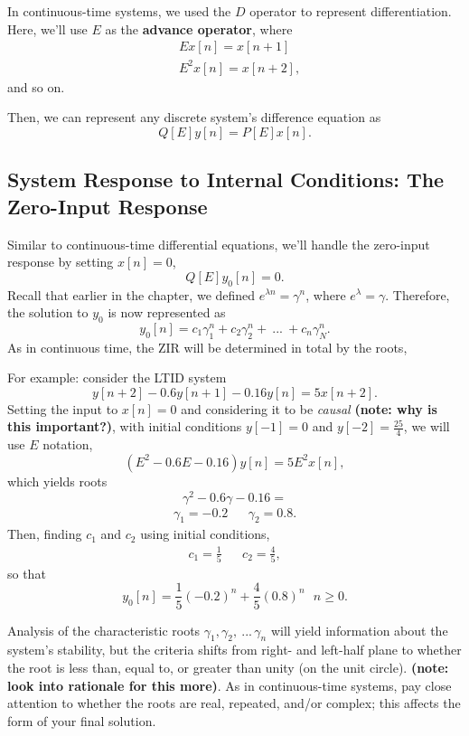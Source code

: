 \documentclass{article}
\begin{document}
In continuous-time systems, we used the \(D\) operator to represent differentiation. Here, we'll use \(E\) as the \textbf{advance operator}, where
\begin{align*}
	&Ex[n] = x[n+1] \\
	&E^2x[n] = x[n+2],
\end{align*}
and so on.

Then, we can represent any discrete system's difference equation as
\[
	Q[E]y[n] = P[E]x[n].
\]

\subsection{System Response to Internal Conditions: The Zero-Input Response}

Similar to continuous-time differential equations, we'll handle the zero-input response by setting \(x[n] = 0\),
\[
	Q[E]y_0[n] = 0.
\]
Recall that earlier in the chapter, we defined \(e^{\lambda n} = \gamma^n\), where \(e^{\lambda} = \gamma\). Therefore, the solution to \(y_0\) is now represented as 
\[
	y_0[n] = c_1\gamma_1^n + c_2\gamma_2^n + \ ... \ + c_n\gamma^n_N.
\]
As in continuous time, the ZIR will be determined in total by the roots, 

For example: consider the LTID system 
\[
	y[n+2] - 0.6y[n+1] - 0.16y[n] = 5x[n+2].
\]
Setting the input to \(x[n] = 0\) and considering it to be \textit{causal} \textbf{(note: why is this important?)}, with initial conditions \(y[-1] = 0\) and \(y[-2] = \frac{25}{4}\), we will use \(E\) notation, 
\[
	(E^2 - 0.6E -0.16)y[n] = 5E^2x[n],
\]
which yields roots
\[
  \gamma^2 - 0.6\gamma - 0.16 = 
\]
\begin{align*}
	\gamma_1 = -0.2 &&\gamma_2 = 0.8.
\end{align*}
Then, finding \(c_1\) and \(c_2\) using initial conditions, 
\begin{align*}
	c_1 = \frac{1}{5} && c_2 = \frac{4}{5},
\end{align*}
so that
\[
	y_0[n] = \frac{1}{5}(-0.2)^n + \frac{4}{5}(0.8)^n \ \ \ n \geq 0.
\]

Analysis of the characteristic roots \(\gamma_1, \gamma_2, \ ... \, \gamma_n\) will yield information about the system's stability, but the criteria shifts from right- and left-half plane to whether the root is less than, equal to, or greater than unity (on the unit circle). \textbf{(note: look into rationale for this more)}. As in continuous-time systems, pay close attention to whether the roots are real, repeated, and/or complex; this affects the form of your final solution.
\end{document}
